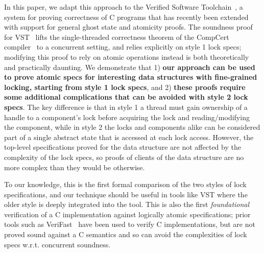In this paper, we adapt this approach to the Verified Software Toolchain~\cite{plfcc}, a system for proving correctness of C programs that has recently been extended with support for general ghost state and atomicity proofs. The soundness proof for VST~\cite{cpm} lifts the single-threaded correctness theorem of the CompCert compiler~\cite{compcert} to a concurrent setting, and relies explicitly on style 1 lock specs; modifying this proof to rely on atomic operations instead is both theoretically and practically daunting. We demonstrate that 1) \textbf{our approach can be used to prove atomic specs for interesting data structures with fine-grained locking, starting from style 1 lock specs}, and 2) \textbf{these proofs require some additional complications that can be avoided with style 2 lock specs}. The key difference is that in style 1 a thread must gain ownership of a handle to a component's lock before acquiring the lock and reading/modifying the component, while in style 2 the locks and components alike can be considered part of a single abstract state that is accessed at each lock access. However, the top-level specifications proved for the data structure are not affected by the complexity of the lock specs, so proofs of clients of the data structure are no more complex than they would be otherwise.

To our knowledge, this is the first formal comparison of the two styles of lock specifications, and our technique should be useful in tools like VST where the older style is deeply integrated into the tool. This is also the first \emph{foundational} verification of a C implementation against logically atomic specifications; prior tools such as VeriFast~\cite{verifast-conc} have been used to verify C implementations, but are not proved sound against a C semantics and so can avoid the complexities of lock specs w.r.t. concurrent soundness.


